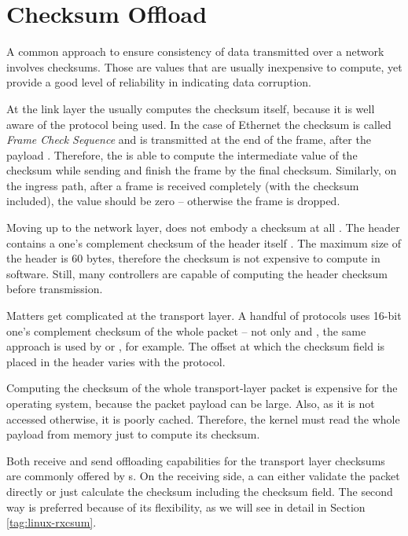 \section{Checksum Offload}

A common approach to ensure consistency of data transmitted over a network
involves checksums. Those are values that are usually inexpensive to compute,
yet provide a good level of reliability in indicating data corruption.

At the link layer the  usually computes the checksum itself, because it
is well aware of the protocol being used. In the case of Ethernet the
checksum is called \emph{Frame Check Sequence} and is transmitted at the end of
the frame, after the payload \cite{ethernet}. Therefore, the  is able to
compute the intermediate value of the checksum while sending and finish the frame
by the final checksum. Similarly, on the ingress path, after a frame is received
completely (with the checksum included), the value should be zero -- otherwise
the frame is dropped.

Moving up to the network layer,  does not embody a checksum at
all \cite{RFC2460}. The  header contains a one's complement checksum of the
header itself \cite{RFC0791}. The maximum size of the header is 60 bytes,
therefore the checksum is not expensive to compute in software. Still, many controllers are
capable of computing the  header checksum before transmission.

Matters get complicated at the transport layer. A handful of protocols uses 16-bit
one's complement checksum of the whole packet -- not only  and ,
the same approach is used by  or , for example. The offset at
which the checksum field is placed in the header varies with the protocol.

Computing the checksum of the whole transport-layer packet is expensive for the
operating system, because the packet payload can be large. Also, as it is not
accessed otherwise, it is poorly cached. Therefore, the kernel must read the
whole payload from memory just to compute its checksum.

Both receive and send offloading capabilities for the transport layer checksums are
commonly offered by s. On the receiving side, a  can either
validate the packet directly or just calculate the checksum including the
checksum field. The second way is preferred because of its flexibility, as we
will see in detail in Section \ref{tag:linux-rxcsum}.

